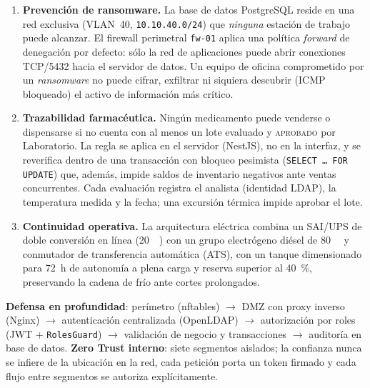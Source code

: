 \documentclass[11pt,a4paper,oneside]{report}
\newcommand{\cod}[1]{\texttt{\small #1}}
\begin{document}
\begin{enumerate}[label=\textbf{\arabic*.},leftmargin=*]
  \item \textbf{Prevención de ransomware.} La base de datos PostgreSQL reside en una red
  exclusiva (VLAN~40, \cod{10.10.40.0/24}) que \emph{ninguna} estación de trabajo puede alcanzar.
  El firewall perimetral \cod{fw-01} aplica una política \emph{forward} de denegación por
  defecto: sólo la red de aplicaciones puede abrir conexiones TCP/5432 hacia el servidor de
  datos. Un equipo de oficina comprometido por un \emph{ransomware} no puede cifrar,
  exfiltrar ni siquiera descubrir (ICMP bloqueado) el activo de información más crítico.

  \item \textbf{Trazabilidad farmacéutica.} Ningún medicamento puede venderse o dispensarse
  si no cuenta con al menos un lote evaluado y \textsc{aprobado} por Laboratorio. La regla
  se aplica en el servidor (NestJS), no en la interfaz, y se reverifica dentro de una
  transacción con bloqueo pesimista (\cod{SELECT \dots{} FOR UPDATE}) que, además, impide
  saldos de inventario negativos ante ventas concurrentes. Cada evaluación registra el
  analista (identidad LDAP), la temperatura medida y la fecha; una excursión térmica
  impide aprobar el lote.

  \item \textbf{Continuidad operativa.} La arquitectura eléctrica combina un SAI/UPS de
  doble conversión en línea (\SI{20}{\kilo\voltampere}) con un grupo electrógeno diésel de
  \SI{80}{\kilo\voltampere} y conmutador de transferencia automática (ATS), con un tanque
  dimensionado para \SI{72}{\hour} de autonomía a plena carga y reserva superior al
  \SI{40}{\percent}, preservando la cadena de frío ante cortes prolongados.
\end{enumerate}

\begin{destacado}
\textbf{Defensa en profundidad}: perímetro (nftables) $\rightarrow$ DMZ con proxy inverso
(Nginx) $\rightarrow$ autenticación centralizada (OpenLDAP) $\rightarrow$ autorización
por roles (JWT + \cod{RolesGuard}) $\rightarrow$ validación de negocio y transacciones
$\rightarrow$ auditoría en base de datos.
\textbf{Zero Trust interno}: siete segmentos aislados; la confianza nunca se infiere de la
ubicación en la red, cada petición porta un token firmado y cada flujo entre segmentos
se autoriza explícitamente.
\end{destacado}
\end{document}
